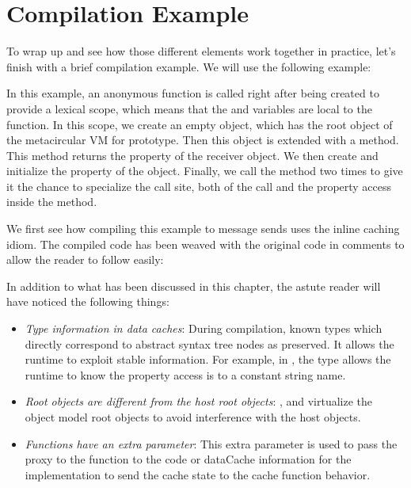 \section{Compilation Example}

To wrap up and see how those different elements work together in practice,
let's finish with a brief compilation example. We will use the following example:


In this example, an anonymous function is called right after being created to
provide a lexical scope, which means that the  and  variables are
local to the function. In this scope, we create an  empty object, which
has the root object of the metacircular VM for prototype. Then this object is
extended with a  method. This method returns the  property of
the receiver object. We then create and initialize the  property of the
 object. Finally, we call the  method two times to give it the
chance to specialize the call site, both of the  call and the 
property access inside the  method.

We first see how compiling this example to message sends uses the inline
caching idiom. The compiled code has been weaved with the original code in
comments to allow the reader to follow easily:


\newpage

In addition to what has been discussed in this chapter, the astute reader
will have noticed the following things:
\begin{itemize}
    \item \textit{Type information in data caches}: During compilation, known
    types which directly correspond to abstract syntax tree nodes as preserved.
    It allows the runtime to exploit stable information. For example, in
    , the  type allows the runtime to know the
    property access is to a constant string name.    
    \item \textit{Root objects are different from the host root objects}:
    ,  and  virtualize the
    object model root objects to avoid interference with the host objects.
    \item \textit{Functions have an extra  parameter}: This extra
    parameter is used to pass the proxy to the function to the code or
    dataCache information for the implementation to send the cache state to the
    cache function behavior.
\end{itemize}

